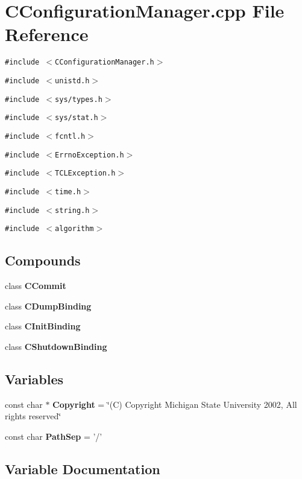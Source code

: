 \section{CConfiguration\-Manager.cpp File Reference}
\label{CConfigurationManager_8cpp}
{\tt \#include $<$CConfiguration\-Manager.h$>$}\par
{\tt \#include $<$unistd.h$>$}\par
{\tt \#include $<$sys/types.h$>$}\par
{\tt \#include $<$sys/stat.h$>$}\par
{\tt \#include $<$fcntl.h$>$}\par
{\tt \#include $<$Errno\-Exception.h$>$}\par
{\tt \#include $<$TCLException.h$>$}\par
{\tt \#include $<$time.h$>$}\par
{\tt \#include $<$string.h$>$}\par
{\tt \#include $<$algorithm$>$}\par
\subsection*{Compounds}
\begin{CompactItemize}
\item 
class {\bf CCommit}
\item 
class {\bf CDump\-Binding}
\item 
class {\bf CInit\-Binding}
\item 
class {\bf CShutdown\-Binding}
\end{CompactItemize}
\subsection*{Variables}
\begin{CompactItemize}
\item 
const char $\ast$ {\bf Copyright} = \char`\"{}(C) Copyright Michigan State University 2002, All rights reserved\char`\"{}
\item 
const char {\bf Path\-Sep} = '/'
\end{CompactItemize}


\subsection{Variable Documentation}
